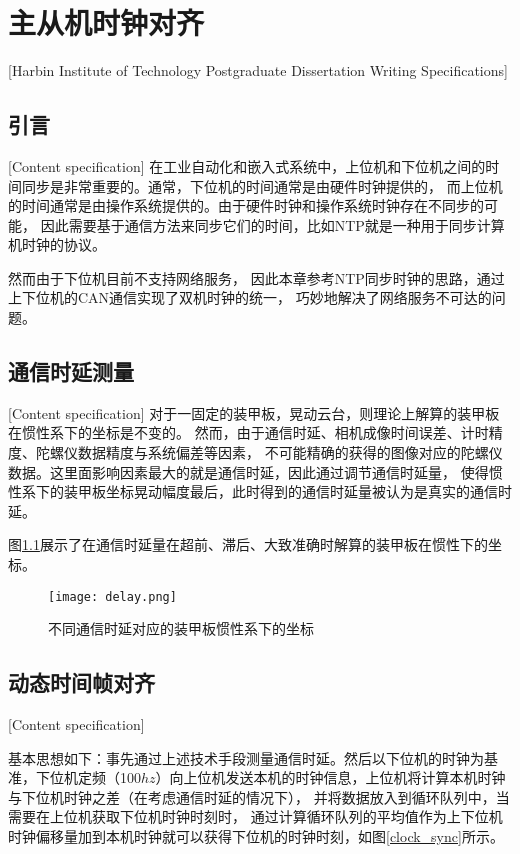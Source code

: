 \chapter[主从机时钟对齐]{主从机时钟对齐}[Harbin Institute of Technology Postgraduate Dissertation Writing Specifications]

\section{引言}[Content specification]
在工业自动化和嵌入式系统中，上位机和下位机之间的时间同步是非常重要的。通常，下位机的时间通常是由硬件时钟提供的，
而上位机的时间通常是由操作系统提供的。由于硬件时钟和操作系统时钟存在不同步的可能，
因此需要基于通信方法来同步它们的时间，比如NTP就是一种用于同步计算机时钟的协议。
\par

然而由于下位机目前不支持网络服务，
因此本章参考NTP同步时钟的思路，通过上下位机的CAN通信实现了双机时钟的统一，
巧妙地解决了网络服务不可达的问题。

\section{通信时延测量}[Content specification]
对于一固定的装甲板，晃动云台，则理论上解算的装甲板在惯性系下的坐标是不变的。
然而，由于通信时延、相机成像时间误差、计时精度、陀螺仪数据精度与系统偏差等因素，
不可能精确的获得的图像对应的陀螺仪数据。这里面影响因素最大的就是通信时延，因此通过调节通信时延量，
使得惯性系下的装甲板坐标晃动幅度最后，此时得到的通信时延量被认为是真实的通信时延。
\par
图\ref{delay}展示了在通信时延量在超前、滞后、大致准确时解算的装甲板在惯性下的坐标。
\begin{figure}[H]
    \centering
    \texttt{[image: delay.png]} 
    \caption{不同通信时延对应的装甲板惯性系下的坐标} 
    \label{delay}
\end{figure}

\section{动态时间帧对齐}[Content specification]

基本思想如下：事先通过上述技术手段测量通信时延。然后以下位机的时钟为基准，下位机定频（100$hz$）向上位机发送本机的时钟信息，上位机将计算本机时钟与下位机时钟之差（在考虑通信时延的情况下），
并将数据放入到循环队列中，当需要在上位机获取下位机时钟时刻时，
通过计算循环队列的平均值作为上下位机时钟偏移量加到本机时钟就可以获得下位机的时钟时刻，如图\ref{clock_sync}所示。

